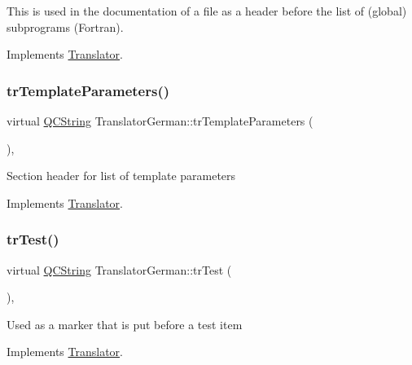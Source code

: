 This is used in the documentation of a file as a header before the list of (global) subprograms (Fortran). 

Implements \mbox{\hyperlink{class_translator}{Translator}}.

\mbox{\label{class_translator_german_ab94de36fa089331344a018336ad468d4}} 
\subsubsection{\texorpdfstring{trTemplateParameters()}{trTemplateParameters()}}
{\footnotesize\ttfamily virtual \mbox{\hyperlink{class_q_c_string}{Q\+C\+String}} Translator\+German\+::tr\+Template\+Parameters (\begin{DoxyParamCaption}{ }\end{DoxyParamCaption})\hspace{0.3cm}{\ttfamily [inline]}, {\ttfamily [virtual]}}

Section header for list of template parameters 

Implements \mbox{\hyperlink{class_translator}{Translator}}.

\mbox{\label{class_translator_german_a2eca39b7dfd5a6ad860c1081f292cd5e}} 
\subsubsection{\texorpdfstring{trTest()}{trTest()}}
{\footnotesize\ttfamily virtual \mbox{\hyperlink{class_q_c_string}{Q\+C\+String}} Translator\+German\+::tr\+Test (\begin{DoxyParamCaption}{ }\end{DoxyParamCaption})\hspace{0.3cm}{\ttfamily [inline]}, {\ttfamily [virtual]}}

Used as a marker that is put before a test item 

Implements \mbox{\hyperlink{class_translator}{Translator}}.

\mbox{\label{class_translator_german_a16a7b0fca3b6fddaf57bc822e8539f59}} 
